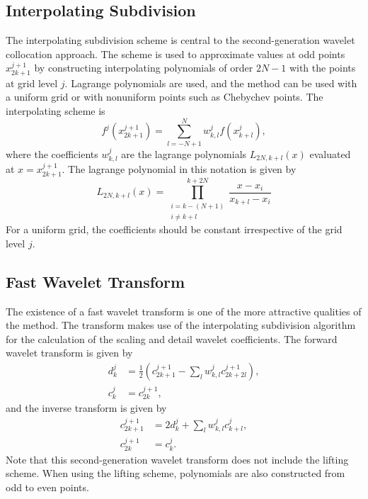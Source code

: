 \documentclass[11pt]{article}
\begin{document}
\subsection{Interpolating Subdivision}
The interpolating subdivision scheme is central to the second-generation wavelet collocation approach. The scheme is used to
approximate values at odd points $x_{2k+1}^{j+1}$ by constructing interpolating polynomials of order $2N-1$ with the points
at grid level $j$. Lagrange polynomials are used, and the method can be used with a uniform grid or with 
nonuniform points such as Chebychev points. The interpolating scheme is 
\begin{equation}
    f^j(x_{2k+1}^{j+1})=\sum_{l=-N+1}^{N} w_{k,l}^{j} f(x_{k+l}^{j}),
\end{equation}
where the coefficients $w_{k,l}^{j}$ are the lagrange polynomials $L_{2N,k+l}(x)$ evaluated at $x=x_{2k+1}^{j+1}$. The 
lagrange polynomial in this notation is given by 
\begin{equation}
    L_{2N,k+l}(x)=\prod_{ \substack{ i=k-(N+1) \\ i\neq k+l } }^{k+2N} \frac{x-x_i}{x_{k+l}-x_i}
\end{equation}
For a uniform grid, the coefficients should be constant irrespective of the grid level $j$.
\subsection{Fast Wavelet Transform}
The existence of a fast wavelet transform is one of the more attractive qualities of the method. The transform makes use of the 
interpolating subdivision algorithm for the calculation of the scaling and detail wavelet coefficients. The forward wavelet transform is given by
\begin{equation}
	\begin{split}
		d_{k}^{j} &= \frac{1}{2} \left( c_{2k+1}^{j+1}-\sum_{l} w_{k,l}^{j} c_{2k+2l}^{j+1} \right), \\
		c_{k}^{j} &= c_{2k}^{j+1},
	\end{split}
\end{equation}
and the inverse transform is given by 
\begin{equation}
	\begin{split}
		c_{2k+1}^{j+1} &= 2 d_{k}^{j}  + \sum_{l} w_{k,l}^{j} c_{k+l}^{j}, \\
		c_{2k}^{j+1} &= c_{k}^{j}.
	\end{split}
\end{equation}
Note that this second-generation wavelet transform does not include the lifting scheme. When using the lifting scheme,
polynomials are also constructed from odd to even points.
\end{document}
